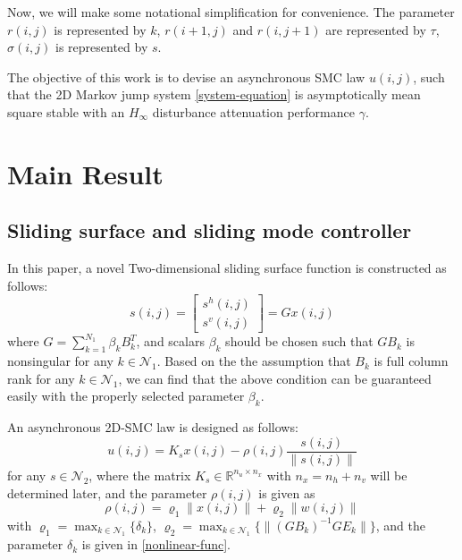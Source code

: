 \documentclass[conference]{IEEEtran}
\begin{document}
	Now, we will make some notational simplification for convenience. The parameter $r(i,j)$ is represented by $k$, $r(i+1,j)$ and $r(i,j+1)$ are represented by $\tau$, $\sigma(i,j)$ is represented by $s$. 
	
	
	
	 The objective of this work is to devise an asynchronous  SMC law $u(i,j)$, such that the 2D Markov jump system \eqref{system-equation} is asymptotically mean square stable with an $H_{\infty}$ disturbance attenuation performance $\gamma$. 

\section{Main Result}

\subsection{ Sliding surface and sliding mode controller} \label{sliding-surface}
	In this paper, a novel Two-dimensional sliding surface function is constructed as follows: 
	\begin{equation}\label{siding-surface-equation}	
		s(i,j) = \begin{bmatrix}
					s^{h}(i,j)\\
					s^{v}(i,j)
					\end{bmatrix}
			   = Gx(i,j)
	\end{equation}
	where $G=\sum_{k=1}^{N_{1}}\beta_{k}B^{T}_{k}$, and scalars $\beta_{k}$ should be chosen such that $GB_{k}$ is nonsingular for any $k\in\mathcal{N}_{1}$. Based on the the assumption that $B_{k}$ is full column rank for any $k\in\mathcal{N}_{1}$, we can find that the above condition can be guaranteed easily with the properly selected parameter $\beta_{k}$. 
 	
 	An asynchronous 2D-SMC law is designed as follows:
	\begin{equation}\label{smc-law}
		u(i,j) = K_{s}x(i,j)-\rho(i,j)\frac{s(i,j)}{\|s(i,j)\|}
	\end{equation}
	for any $s\in\mathcal{N}_{2}$, where the matrix $K_{s}\in\mathbb{R}^{n_u\times n_x}$ with $n_x=n_h+n_v$ will be determined later, and the parameter $\rho(i,j)$ is given as
	\begin{equation}\label{varrho}
	\rho(i,j) = \varrho_{1}\|x(i,j)\| + \varrho_{2}\|w(i,j)\|
	\end{equation}
	with $\varrho_{1}=\max_{k\in\mathcal{N}_{1}} \{\delta_{k} \}$, $\varrho_{2} = \max_{k\in\mathcal{N}_{1}}\{\|(GB_{k})^{-1}GE_{k}\| \} $, and the parameter $\delta_{k}$ is given in \eqref{nonlinear-func}. 
	
\end{document}
